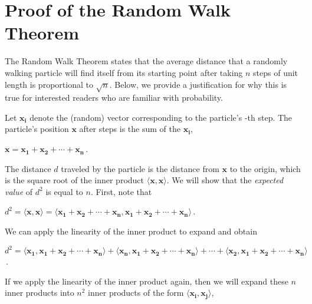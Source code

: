 \chapter[Proof of the Random Walk Theorem]{Proof of the Random Walk Theorem}
\label{chapter:random_walk_theorem}
\renewcommand{\chaptertitle}{Proof of the Random Walk Theorem}

The Random Walk Theorem states that the average distance that a randomly walking particle will find itself from its starting point after taking $n$ steps of unit length is proportional to $\sqrt{n}$. Below, we provide a justification for why this is true for interested readers who are familiar with probability.

Let $\mathbf{x_i}$ denote the (random) vector corresponding to the particle's -th step. The particle's position $\mathbf{x}$ after  steps is the sum of the $\mathbf{x_i}$,

\begin{center}
$\mathbf{x} = \mathbf{x_1} + \mathbf{x_2} + \cdots + \mathbf{x_n}$\,.
\end{center}

The distance $d$ traveled by the particle is the distance from $\mathbf{x}$ to the origin, which is the square root of the inner product $\langle \mathbf{x}, \mathbf{x} \rangle$. We will show that the \textit{expected value} of $d^2$ is equal to $n$. First, note that

\begin{center}
$d^2 = \langle \mathbf{x}, \mathbf{x} \rangle = \langle \mathbf{x_1} + \mathbf{x_2} + \cdots + \mathbf{x_n}, \mathbf{x_1} + \mathbf{x_2} + \cdots + \mathbf{x_n} \rangle$\,.
\end{center}

\noindent We can apply the linearity of the inner product to expand and obtain
\begin{center}
$d^2 = \langle \mathbf{x_1}, \mathbf{x_1} + \mathbf{x_2} + \cdots + \mathbf{x_n} \rangle + \langle \mathbf{x_n}, \mathbf{x_1} + \mathbf{x_2} + \cdots + \mathbf{x_n} \rangle + \cdots + \langle \mathbf{x_2}, \mathbf{x_1} + \mathbf{x_2} + \cdots + \mathbf{x_n} \rangle$\,.
\end{center}

\noindent If we apply the linearity of the inner product again, then we will expand these $n$ inner products into $n^2$ inner products of the form $\langle \mathbf{x_i}, \mathbf{x_j} \rangle$,

